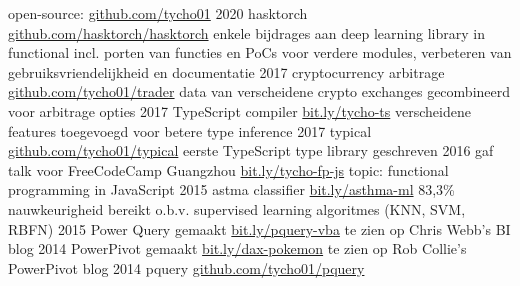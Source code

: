 \documentclass[]{friggeri-cv}
\begin{document}
\begin{entrylist}
\entry
    {}
    {open-source: }
    {\href{https://www.github.com/tycho01}{github.com/tycho01}}
    {}
  \entry
    {2020}
    {hasktorch}
    {\href{https://github.com/hasktorch/hasktorch}{github.com/hasktorch/hasktorch}}
    {enkele bijdrages aan deep learning library in functional incl. porten van functies en PoCs voor verdere modules, verbeteren van gebruiksvriendelijkheid en documentatie}
  \entry
    {2017}
    {cryptocurrency arbitrage}
    {\href{https://github.com/tycho01/trader}{github.com/tycho01/trader}}
    {data van verscheidene crypto exchanges gecombineerd voor arbitrage opties}
  \entry
    {2017}
    {TypeScript compiler}
    {\href{https://github.com/Microsoft/TypeScript/pulls/tycho01}{bit.ly/tycho-ts}}
    {verscheidene features toegevoegd voor betere type inference}
  \entry
    {2017}
    {typical}
    {\href{https://github.com/tycho01/typical}{github.com/tycho01/typical}}
    {eerste TypeScript type library geschreven}
  \entry
    {2016}
    {
      gaf talk voor
      FreeCodeCamp Guangzhou
    }
    {\href{https://www.slideshare.net/TychoGrouwstra/fp-in-js}{bit.ly/tycho-fp-js}}
    {topic: functional programming in JavaScript}
  \entry
    {2015}
    {
      astma
      classifier
    }
    {\href{http://bit.ly/asthma-ml}{bit.ly/asthma-ml}}
    {83,3\% nauwkeurigheid bereikt o.b.v. supervised learning algoritmes (KNN, SVM, RBFN)}
  \entry
    {2015}
    {
      Power Query 
      gemaakt
    }
    {\href{https://blog.crossjoin.co.uk/2015/06/10/power-queryexcel-2016-vba-examples/}{bit.ly/pquery-vba}}
    {
      te zien op
      Chris Webb's BI blog
    }
  \entry
    {2014}
    {
      PowerPivot 
      gemaakt
    }
    {\href{https://powerpivotpro.com/2014/02/optimal-set-selection-power-pivot-does-pokemon-and-my-brain-just-exploded/}{bit.ly/dax-pokemon}}
    {
      te zien op
      Rob Collie's PowerPivot blog
    }
  \entry
    {2014}
    {pquery}
    {\href{https://github.com/tycho01/pquery}{github.com/tycho01/pquery}}

\end{entrylist}
\end{document}
